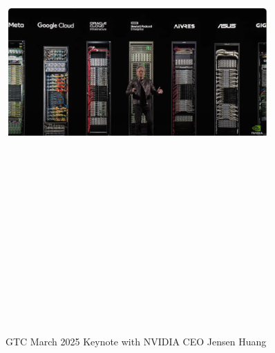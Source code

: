 \documentclass[a4paper,12pt]{article}
\begin{document}
\vspace{50pt} %
\begin{figure}[h]	\vspace{-5pt} %
	\centering
	\vspace{-10pt} %
	\includegraphics[width=0.9\textwidth, height=20cm, keepaspectratio]{../Talks Blogs/GTC March 2025 Keynote with NVIDIA CEO Jensen Huang}
	\vspace{-5pt} %
	\caption{GTC March 2025 Keynote with NVIDIA CEO Jensen Huang}
	\vspace{-10pt}
\end{figure}
\end{document}
